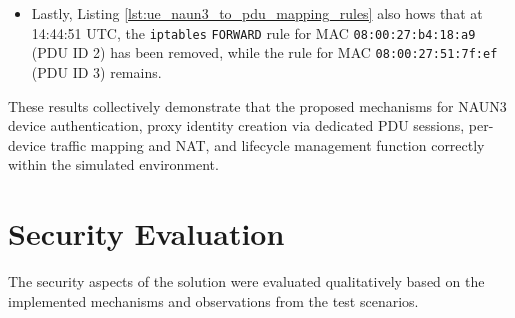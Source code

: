\begin{itemize}
    \item Lastly, Listing \ref{lst:ue_naun3_to_pdu_mapping_rules} also hows that at 14:44:51 \ac{UTC}, the \texttt{iptables} \texttt{FORWARD} rule for \ac{MAC} \texttt{08:00:27:b4:18:a9} (\ac{PDU} ID 2) has been removed, while the rule for \ac{MAC} \texttt{08:00:27:51:7f:ef} (\ac{PDU} ID 3) remains.
\end{itemize}

These results collectively demonstrate that the proposed mechanisms for \ac{NAUN3} device authentication, proxy identity creation via dedicated \ac{PDU} sessions, per-device traffic mapping and \ac{NAT}, and lifecycle management function correctly within the simulated environment.

\section{Security Evaluation}

The security aspects of the solution were evaluated qualitatively based on the implemented mechanisms and observations from the test scenarios.

